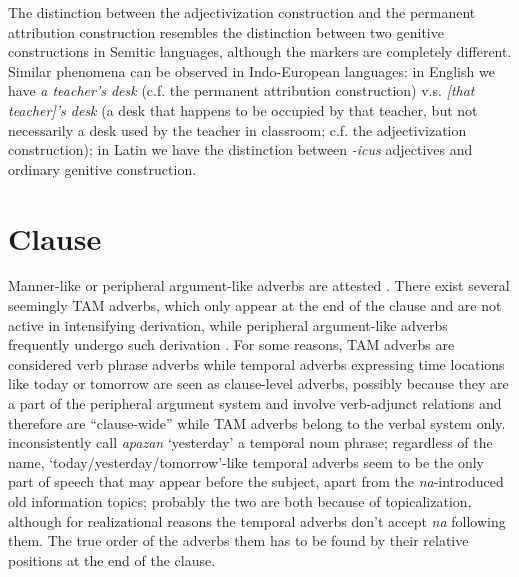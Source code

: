 \documentclass[a4paper, oneside, 12pt]{report}
\newcommand*{\citepage}[1]{p.~{#1}}
\newcommand*{\citepages}[1]{pp.~{#1}}
\newcommand{\form}[1]{\emph{#1}}
\newcommand{\translate}[1]{`#1'}
\begin{document}
The distinction between the adjectivization construction 
and the permanent attribution construction 
resembles the distinction between two genitive constructions in Semitic languages,
although the markers are completely different. 
Similar phenomena can be observed in Indo-European languages:
in English we have \form{a teacher's desk} (c.f. the permanent attribution construction)
v.s. \form{[that teacher]'s desk} 
(a desk that happens to be occupied by that teacher, 
but not necessarily a desk used by the teacher in classroom; 
c.f. the adjectivization construction); 
in Latin we have the distinction between \form{-icus} adjectives and 
ordinary genitive construction.

\chapter{Clause}

Manner-like or peripheral argument-like adverbs 
are attested \citep[\citepage{110}, (106-108)]{friesen2017grammar}.
There exist several seemingly TAM adverbs,
which only appear at the end of the clause 
and are not active in intensifying derivation,
while peripheral argument-like adverbs frequently undergo such derivation
\citep[\citepages{110-111}, (109-111)]{friesen2017grammar}.
For some reasons, TAM adverbs are considered verb phrase adverbs 
while temporal adverbs expressing time locations like today or tomorrow 
are seen as clause-level adverbs,
possibly because they are a part of the peripheral argument system 
and involve verb-adjunct relations and therefore are ``clause-wide''
while TAM adverbs belong to the verbal system only.
\citep[\citepage308]{friesen2017grammar} 
inconsistently call \form{apazan} \translate{yesterday} 
a temporal noun phrase; 
regardless of the name, 
\translate{today/yesterday/tomorrow}-like temporal adverbs 
seem to be the only part of speech that may appear before the subject,
apart from the \form{na}-introduced old information topics;
probably the two are both because of topicalization,
although for realizational reasons the temporal adverbs don't accept \form{na} following them.
The true order of the adverbs them has to be found 
by their relative positions at the end of the clause.



\end{document}
